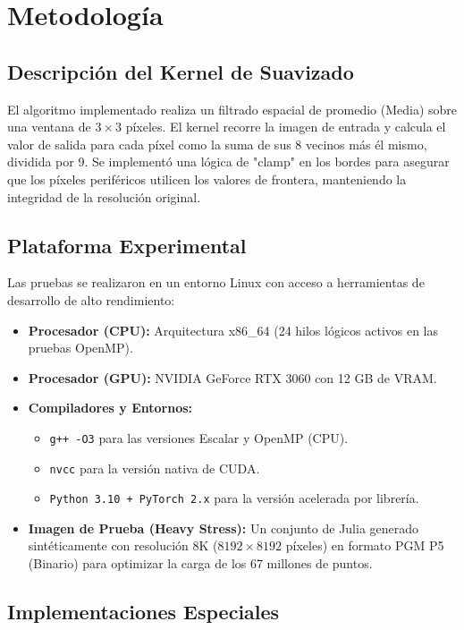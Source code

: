 \section{Metodología}

\subsection{Descripción del Kernel de Suavizado}
El algoritmo implementado realiza un filtrado espacial de promedio (Media) sobre una ventana de $3 \times 3$ píxeles. El kernel recorre la imagen de entrada y calcula el valor de salida para cada píxel como la suma de sus 8 vecinos más él mismo, dividida por 9. Se implementó una lógica de "clamp" en los bordes para asegurar que los píxeles periféricos utilicen los valores de frontera, manteniendo la integridad de la resolución original.

\subsection{Plataforma Experimental}
Las pruebas se realizaron en un entorno Linux con acceso a herramientas de desarrollo de alto rendimiento:

\begin{itemize}
    \item \textbf{Procesador (CPU):} Arquitectura x86\_64 (24 hilos lógicos activos en las pruebas OpenMP).
    \item \textbf{Procesador (GPU):} NVIDIA GeForce RTX 3060 con 12 GB de VRAM.
    \item \textbf{Compiladores y Entornos:} 
        \begin{itemize}
            \item \texttt{g++ -O3} para las versiones Escalar y OpenMP (CPU).
            \item \texttt{nvcc} para la versión nativa de CUDA.
            \item \texttt{Python 3.10 + PyTorch 2.x} para la versión acelerada por librería.
        \end{itemize}
    \item \textbf{Imagen de Prueba (Heavy Stress):} Un conjunto de Julia generado sintéticamente con resolución 8K ($8192 \times 8192$ píxeles) en formato PGM P5 (Binario) para optimizar la carga de los 67 millones de puntos.
\end{itemize}

\subsection{Implementaciones Especiales}

